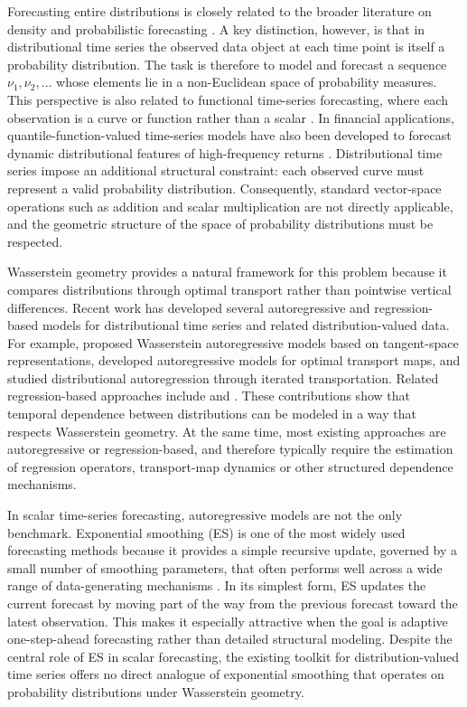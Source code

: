 \documentclass[a4paper, 11pt]{article}
\theoremstyle{definition}
\begin{document}
Forecasting entire distributions is closely related to the broader literature on density and probabilistic forecasting \citep{Diebold1998Density,TayWallis2000,GneitingKatzfuss2014}. A key distinction, however, is that in distributional time series the observed data object at each time point is itself a probability distribution. The task is therefore to model and forecast a sequence $\nu_1,\nu_2,\ldots$ whose elements lie in a non-Euclidean space of probability measures. This perspective is also related to functional time-series forecasting, where each observation is a curve or function rather than a scalar \citep{HyndmanUllah2007,HorvathKokoszka2012}. In financial applications, quantile-function-valued time-series models have also been developed to forecast dynamic distributional features of high-frequency returns \citep{Chen2022DQF}. Distributional time series impose an additional structural constraint: each observed curve must represent a valid probability distribution. Consequently, standard vector-space operations such as addition and scalar multiplication are not directly applicable, and the geometric structure of the space of probability distributions must be respected.

Wasserstein geometry provides a natural framework for this problem because it compares distributions through optimal transport rather than pointwise vertical differences. Recent work has developed several autoregressive and regression-based models for distributional time series and related distribution-valued data. For example, \citet{zhang2022wasserstein} proposed Wasserstein autoregressive models based on tangent-space representations, \citet{Zhu2023} developed autoregressive models for optimal transport maps, and \citet{ghodrati2024distributional} studied distributional autoregression through iterated transportation. Related regression-based approaches include \citet{ghodrati2022distribution} and \citet{chen2023wasserstein}. These contributions show that temporal dependence between distributions can be modeled in a way that respects Wasserstein geometry. At the same time, most existing approaches are autoregressive or regression-based, and therefore typically require the estimation of regression operators, transport-map dynamics or other structured dependence mechanisms.

In scalar time-series forecasting, autoregressive models are not the only benchmark. Exponential smoothing (ES) is one of the most widely used forecasting methods because it provides a simple recursive update, governed by a small number of smoothing parameters, that often performs well across a wide range of data-generating mechanisms \citep{Gardner1985,Gardner2006,Hyndman2008}. In its simplest form, ES updates the current forecast by moving part of the way from the previous forecast toward the latest observation. This makes it especially attractive when the goal is adaptive one-step-ahead forecasting rather than detailed structural modeling. Despite the central role of ES in scalar forecasting, the existing toolkit for distribution-valued time series offers no direct analogue of exponential smoothing that operates on probability distributions under Wasserstein geometry.
\end{document}
